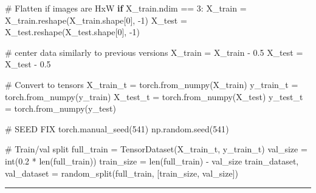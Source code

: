 \documentclass[
  letterpaper,
  DIV=11,
  numbers=noendperiod]{scrartcl}
\newenvironment{Shaded}{\begin{snugshade}}{\end{snugshade}}
\newcommand{\BuiltInTok}[1]{\textcolor[rgb]{0.00,0.23,0.31}{#1}}
\newcommand{\CommentTok}[1]{\textcolor[rgb]{0.37,0.37,0.37}{#1}}
\newcommand{\ControlFlowTok}[1]{\textcolor[rgb]{0.00,0.23,0.31}{\textbf{#1}}}
\newcommand{\DecValTok}[1]{\textcolor[rgb]{0.68,0.00,0.00}{#1}}
\newcommand{\FloatTok}[1]{\textcolor[rgb]{0.68,0.00,0.00}{#1}}
\newcommand{\NormalTok}[1]{\textcolor[rgb]{0.00,0.23,0.31}{#1}}
\newcommand{\OperatorTok}[1]{\textcolor[rgb]{0.37,0.37,0.37}{#1}}
\begin{document}
\begin{Shaded}
\begin{Highlighting}[]
\CommentTok{\# Flatten if images are HxW}
\ControlFlowTok{if}\NormalTok{ X\_train.ndim }\OperatorTok{==} \DecValTok{3}\NormalTok{:}
\NormalTok{    X\_train }\OperatorTok{=}\NormalTok{ X\_train.reshape(X\_train.shape[}\DecValTok{0}\NormalTok{], }\OperatorTok{{-}}\DecValTok{1}\NormalTok{)}
\NormalTok{    X\_test }\OperatorTok{=}\NormalTok{ X\_test.reshape(X\_test.shape[}\DecValTok{0}\NormalTok{], }\OperatorTok{{-}}\DecValTok{1}\NormalTok{)}

\CommentTok{\# center data similarly to previous versions}
\NormalTok{X\_train }\OperatorTok{=}\NormalTok{ X\_train }\OperatorTok{{-}} \FloatTok{0.5}
\NormalTok{X\_test }\OperatorTok{=}\NormalTok{ X\_test }\OperatorTok{{-}} \FloatTok{0.5}

\CommentTok{\# Convert to tensors}
\NormalTok{X\_train\_t }\OperatorTok{=}\NormalTok{ torch.from\_numpy(X\_train)}
\NormalTok{y\_train\_t }\OperatorTok{=}\NormalTok{ torch.from\_numpy(y\_train)}
\NormalTok{X\_test\_t }\OperatorTok{=}\NormalTok{ torch.from\_numpy(X\_test)}
\NormalTok{y\_test\_t }\OperatorTok{=}\NormalTok{ torch.from\_numpy(y\_test)}

\CommentTok{\# SEED FIX}
\NormalTok{torch.manual\_seed(}\DecValTok{541}\NormalTok{)}
\NormalTok{np.random.seed(}\DecValTok{541}\NormalTok{)}

\CommentTok{\# Train/val split}
\NormalTok{full\_train }\OperatorTok{=}\NormalTok{ TensorDataset(X\_train\_t, y\_train\_t)}
\NormalTok{val\_size }\OperatorTok{=} \BuiltInTok{int}\NormalTok{(}\FloatTok{0.2} \OperatorTok{*} \BuiltInTok{len}\NormalTok{(full\_train))}
\NormalTok{train\_size }\OperatorTok{=} \BuiltInTok{len}\NormalTok{(full\_train) }\OperatorTok{{-}}\NormalTok{ val\_size}
\NormalTok{train\_dataset, val\_dataset }\OperatorTok{=}\NormalTok{ random\_split(full\_train, [train\_size, val\_size])}
\end{Highlighting}
\end{Shaded}

\begin{center}\rule{0.5\linewidth}{0.5pt}\end{center}
\end{document}

